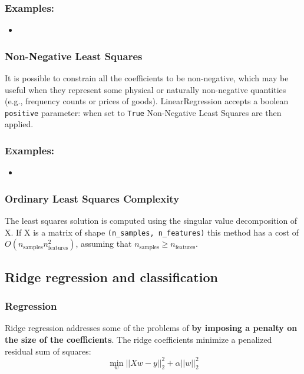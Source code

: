 \subsubsection{Examples:}
\begin{itemize}
\item {}
\end{itemize}
\subsubsection{Non-Negative Least Squares}
It is possible to constrain all the coefficients to be non-negative, which may be useful when they represent some physical or naturally non-negative quantities (e.g., frequency counts or prices of goods). LinearRegression accepts a boolean \verb|positive| parameter: when set to \verb|True| Non-Negative Least Squares are then applied.
\subsubsection{Examples:}
\begin{itemize}
\item {}
\end{itemize}

\subsubsection{Ordinary Least Squares Complexity}
The least squares solution is computed using the singular value decomposition of X. If X is a matrix of shape \verb|(n_samples, n_features)| this method has a cost of $O(n_{\text{samples}} n_{\text{features}}^2)$, assuming that $n_{\text{samples}} \geq n_{\text{features}}$.

\subsection{Ridge regression and classification}
\subsubsection{Regression}
Ridge regression addresses some of the problems of  \textbf{by imposing a penalty on the size of the coefficients}. The ridge coefficients minimize a penalized residual sum of squares:
\begin{equation}
\min_{w} || X w - y||_2^2 + \alpha ||w||_2^2
\end{equation}


